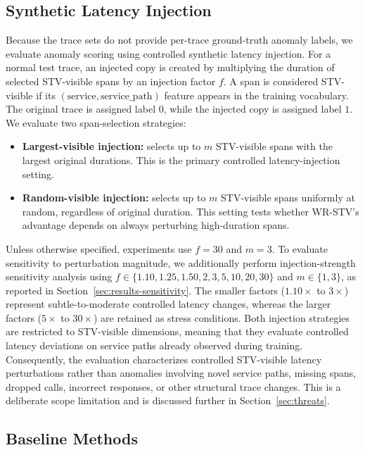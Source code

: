 \documentclass[informatics,article,submit,moreauthors]{Definitions/mdpi}
\newcommand{\rev}[1]{{\color{revisionblue}#1}}
\begin{document}
\subsection{Synthetic Latency Injection}
Because the trace sets do not provide per-trace ground-truth anomaly labels, we evaluate anomaly scoring using controlled synthetic latency injection.
For a normal test trace, an injected copy is created by multiplying the duration of selected STV-visible spans by an injection factor \(f\).
A span is considered STV-visible if its \((\text{service}, \text{service\_path})\) feature appears in the training vocabulary.
The original trace is assigned label \(0\), while the injected copy is assigned label \(1\).
We evaluate two span-selection strategies:
\begin{itemize}
\item \textbf{Largest-visible injection:} selects up to \(m\) STV-visible spans with the largest original durations.
This is the primary controlled latency-injection setting.
\item \textbf{Random-visible injection:} selects up to \(m\) STV-visible spans uniformly at random, regardless of original duration.
This setting tests whether WR-STV's advantage depends on always perturbing high-duration spans.
\end{itemize}
\rev{Unless otherwise specified, experiments use \(f=30\) and \(m=3\).
To evaluate sensitivity to perturbation magnitude, we additionally perform injection-strength sensitivity analysis using \(f \in \{1.10,1.25,1.50,2,3,5,10,20,30\}\) and \(m \in \{1,3\}\), as reported in Section~\ref{sec:results-sensitivity}.
The smaller factors (\(1.10\times\) to \(3\times\)) represent subtle-to-moderate controlled latency changes, whereas the larger factors (\(5\times\) to \(30\times\)) are retained as stress conditions.}
Both injection strategies are restricted to STV-visible dimensions, meaning that they evaluate controlled latency deviations on service paths already observed during training.
\rev{Consequently, the evaluation characterizes controlled STV-visible latency perturbations rather than anomalies involving novel service paths, missing spans, dropped calls, incorrect responses, or other structural trace changes.}
This is a deliberate scope limitation and is discussed further in Section~\ref{sec:threats}.

\subsection{Baseline Methods}
\end{document}
